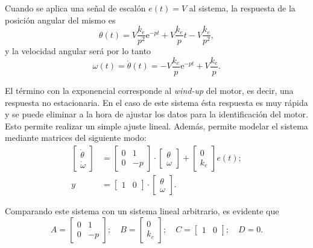 \documentclass{article}
\begin{document}
Cuando se aplica una señal de escalón $e(t) = V$ al sistema, la respuesta de la posición angular del mismo es
\begin{equation} \label{eq:angPos}
    \theta(t) = V\frac{k_e}{p^2}\mathrm{e}^{-pt} + V\frac{k_e}{p}t - V\frac{k_e}{p^2},
\end{equation}
y la velocidad angular será por lo tanto
\begin{equation}
    \omega(t) = \dot\theta(t) = -V\frac{k_e}{p}\mathrm{e}^{-pt} + V\frac{k_e}{p}.
\end{equation}

El término con la exponencial corresponde al \textit{wind-up} del motor, es decir, una respuesta no estacionaria. En el caso de este sistema ésta respuesta es muy rápida y se puede eliminar a la hora de ajustar los datos para la identificación del motor. Esto permite realizar un simple ajuste lineal. Además, permite modelar el sistema mediante matrices del siguiente modo:
\begin{align}
    \begin{bmatrix}
    \dot\theta \\
    \dot\omega
    \end{bmatrix} &= \begin{bmatrix}
    0 & 1 \\
    0 &-p
    \end{bmatrix}\cdot\begin{bmatrix}
    \theta \\
    \omega
    \end{bmatrix}+\begin{bmatrix}
    0\\
    k_e
    \end{bmatrix}e(t); \\
    y &= \begin{bmatrix}
    1& 0
    \end{bmatrix}\cdot\begin{bmatrix}
    \theta \\
    \omega
    \end{bmatrix}.
\end{align}

Comparando este sistema con un sistema lineal arbitrario, es evidente que
\begin{equation}\label{eq:ecuacionesSistema}
    A = \begin{bmatrix}
        0 & 1 \\
        0 &-p
    \end{bmatrix};\quad
    B = \begin{bmatrix}
        0\\
        k_e
    \end{bmatrix};\quad
    C = \begin{bmatrix}
        1& 0
    \end{bmatrix};\quad D = 0.
\end{equation}
\end{document}
